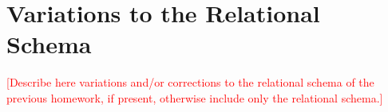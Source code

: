 \section{Variations to the Relational Schema}
\textcolor{red}{[Describe here variations and/or corrections to the relational schema of the previous homework, if present, otherwise include only the relational schema.]}